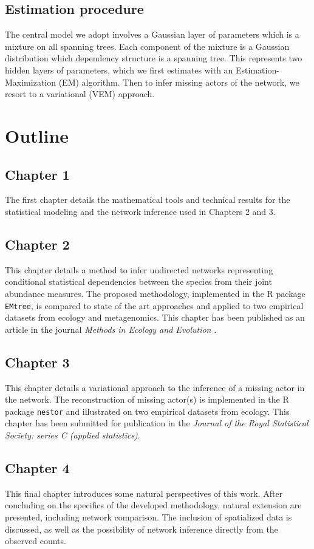  
 \subsection*{Estimation procedure} %
The central model we adopt involves a Gaussian layer of parameters which is a mixture on all spanning trees. Each component of the mixture is a Gaussian distribution which dependency structure is a spanning tree. This represents two hidden layers of parameters, which we first estimates with an Estimation-Maximization (EM) algorithm. Then to infer missing actors of the network, we resort to a variational (VEM) approach.

\section*{Outline} 
  \subsection*{Chapter 1}
The first chapter details the mathematical tools and technical results for the statistical modeling and the network inference used in Chapters 2 and 3.

   \subsection*{Chapter 2}
   This chapter details a method to infer undirected networks representing conditional statistical dependencies between the species from their joint abundance measures.  The proposed methodology, implemented in the R package \texttt{EMtree},  is compared to state of the art approaches and applied to two empirical datasets from ecology and metagenomics. This chapter has been published as an article in the journal \textit{Methods in Ecology and Evolution} \citep{MRA20}.
   
    \subsection*{Chapter 3}
This chapter details a variational approach to the inference of a missing actor in the network. The reconstruction of missing actor(s) is implemented in the R package \texttt{nestor} and illustrated on two  empirical datasets from ecology. This chapter has been submitted for publication in the \textit{Journal of the Royal Statistical Society: series C (applied statistics)}.
 
  \subsection*{Chapter 4}
This final chapter introduces some natural perspectives of this work. After concluding on the specifics of the developed methodology, natural extension are presented, including network comparison. The inclusion of spatialized data is discussed, as well as the possibility of network inference directly from the observed counts.
